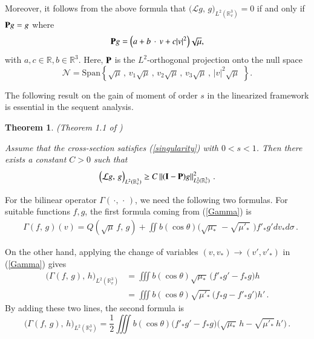 \documentclass{amsart}[12pt, article]
\newtheorem{theo}{Theorem}[section]
\begin{document}
Moreover, it follows {}from the above formula that $\Big({{\mathcal L}} g,\, g\Big)_{L^2({{{\mathbb R}}}^3_v)}=0$ if and only if ${{\bf P}}
g=g$ where
$$
{{\bf P}} g=\Big(a+b\,\cdot\, v+c|v|^2\Big)\sqrt \mu,
$$
with $a, c\in{{{\mathbb R}}}, b\in{{{\mathbb R}}}^3$. Here, ${{\bf P}}$ is the $L^2$-orthogonal
projection onto the null space
\begin{equation*}\label{2.1.3}
\mathcal{N}=\mbox{Span}\left\{\sqrt \mu\,,\,
v_1\sqrt\mu\,,\,v_2\sqrt\mu\,,\,v_3\sqrt\mu\,,\,
|v|^2\sqrt\mu\,\,\right\}.
\end{equation*}

The following result on the gain of
 moment of order $s$ in the linearized framework is essential in the sequent analysis.
\begin{theo}\label{theo2.2}(Theorem 1.1 of \cite{mouhot-strain})

Assume that the cross-section satisfies (\ref{singularity}) with
$0<s<1$. Then there exists a constant $C>0$ such that
\begin{equation*}
\Big({{\mathcal L}} g,\, g\Big)_{L^2({{{\mathbb R}}}^3_v)}\geq C \left\|({{\bf I}}-{{\bf P}})
g\right\|^2_{L^2_s({{{\mathbb R}}}^3_v)}\, .
\end{equation*}
\end{theo}

\smallbreak
For the bilinear operator $\Gamma(\,\cdot,\,\cdot\,)$, we  need
the following  two formulas.
For suitable functions $f, g$, the first formula coming {}from
(\ref{Gamma}) is
\begin{align}\label{1formula}
&\Gamma(f,\, g)(v)=Q(\sqrt{\mu}\, f,\, g)+ \iint b(\cos\theta) \Big(\sqrt{\mu_*}\,
-\sqrt{\mu'_*}\,\,\Big)f'_* g' d v_* d \sigma\,.
\end{align}

On the other hand, applying the change of variables $(v, v_*) \rightarrow (v', v'_*)$ in (\ref{Gamma}) gives
\begin{align*}
\Big(\Gamma(f,\, g),\,  h\Big)_{L^2({{{\mathbb R}}}^3_v)} &= \iiint
b(\cos\theta)
\sqrt{\mu_\ast}\, \big( f'_\ast g' - f_\ast g\big) h\\
&= \iiint b(\cos\theta) \sqrt{\mu'_\ast}\, \big(f_\ast g - f'_\ast
g'\big) h'\,.
\end{align*}
By adding these two lines, the second formula is
\begin{equation}\label{2.2.5}
\Big(\Gamma (f,\, g),\, h\Big)_{L^2({{{\mathbb R}}}^3_v)} = \frac{1}{2} \iiint
b(\cos\theta) \Big(f'_\ast g' - f_\ast g \Big) \Big(
\sqrt{\mu_\ast}\, h - \sqrt{\mu'_\ast}\, h' \Big)\,.
\end{equation}
\end{document}

